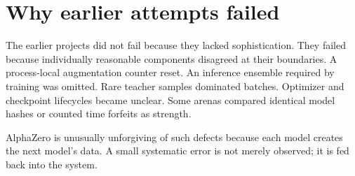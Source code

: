 \documentclass[10.5pt,letterpaper]{article}
\begin{document}
\section{Why earlier attempts failed}

The earlier projects did not fail because they lacked sophistication. They
failed because individually reasonable components disagreed at their
boundaries. A process-local augmentation counter reset. An inference ensemble
required by training was omitted. Rare teacher samples dominated batches.
Optimizer and checkpoint lifecycles became unclear. Some arenas compared
identical model hashes or counted time forfeits as strength.

AlphaZero is unusually unforgiving of such defects because each model creates
the next model's data. A small systematic error is not merely observed; it is
fed back into the system.
\end{document}
